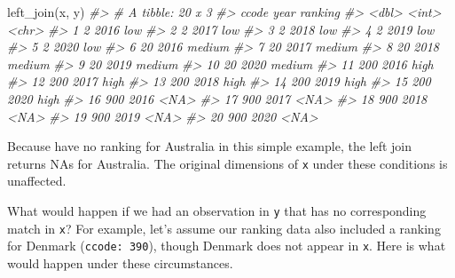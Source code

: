 \documentclass[
  11pt,
]{article}
\newenvironment{Shaded}{\begin{snugshade}}{\end{snugshade}}
\newcommand{\CommentTok}[1]{\textcolor[rgb]{0.56,0.35,0.01}{\textit{#1}}}
\newcommand{\FunctionTok}[1]{\textcolor[rgb]{0.00,0.00,0.00}{#1}}
\newcommand{\NormalTok}[1]{#1}
\begin{document}
\begin{Shaded}
\begin{Highlighting}[]
\FunctionTok{left\_join}\NormalTok{(x, y)}
\CommentTok{\#\textgreater{} \# A tibble: 20 x 3}
\CommentTok{\#\textgreater{}    ccode  year ranking}
\CommentTok{\#\textgreater{}    \textless{}dbl\textgreater{} \textless{}int\textgreater{} \textless{}chr\textgreater{}  }
\CommentTok{\#\textgreater{}  1     2  2016 low    }
\CommentTok{\#\textgreater{}  2     2  2017 low    }
\CommentTok{\#\textgreater{}  3     2  2018 low    }
\CommentTok{\#\textgreater{}  4     2  2019 low    }
\CommentTok{\#\textgreater{}  5     2  2020 low    }
\CommentTok{\#\textgreater{}  6    20  2016 medium }
\CommentTok{\#\textgreater{}  7    20  2017 medium }
\CommentTok{\#\textgreater{}  8    20  2018 medium }
\CommentTok{\#\textgreater{}  9    20  2019 medium }
\CommentTok{\#\textgreater{} 10    20  2020 medium }
\CommentTok{\#\textgreater{} 11   200  2016 high   }
\CommentTok{\#\textgreater{} 12   200  2017 high   }
\CommentTok{\#\textgreater{} 13   200  2018 high   }
\CommentTok{\#\textgreater{} 14   200  2019 high   }
\CommentTok{\#\textgreater{} 15   200  2020 high   }
\CommentTok{\#\textgreater{} 16   900  2016 \textless{}NA\textgreater{}   }
\CommentTok{\#\textgreater{} 17   900  2017 \textless{}NA\textgreater{}   }
\CommentTok{\#\textgreater{} 18   900  2018 \textless{}NA\textgreater{}   }
\CommentTok{\#\textgreater{} 19   900  2019 \textless{}NA\textgreater{}   }
\CommentTok{\#\textgreater{} 20   900  2020 \textless{}NA\textgreater{}}
\end{Highlighting}
\end{Shaded}

Because have no ranking for Australia in this simple example, the left join returns NAs for Australia. The original dimensions of \texttt{x} under these conditions is unaffected.

What would happen if we had an observation in \texttt{y} that has no corresponding match in \texttt{x}? For example, let's assume our ranking data also included a ranking for Denmark (\texttt{ccode:\ 390}), though Denmark does not appear in \texttt{x}. Here is what would happen under these circumstances.
\end{document}
